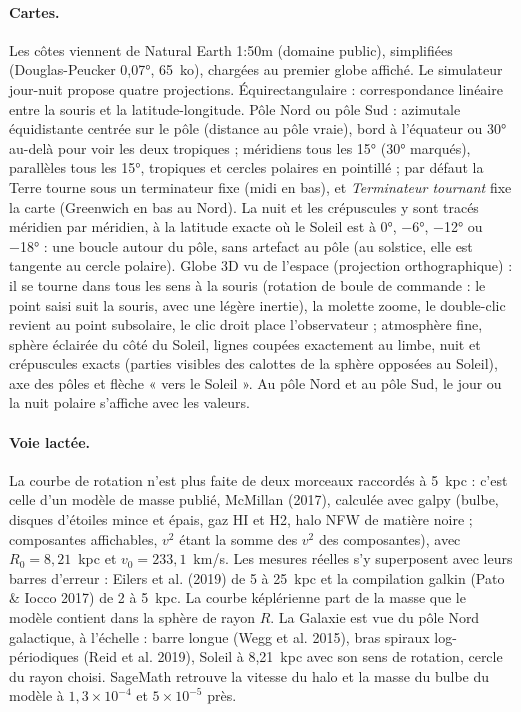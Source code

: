 \paragraph{Cartes.} Les côtes viennent de Natural Earth 1:50m (domaine public), simplifiées (Douglas-Peucker 0,07°,
65~ko), chargées au premier globe affiché. Le simulateur jour-nuit propose quatre projections. Équirectangulaire :
correspondance linéaire entre la souris et la latitude-longitude. Pôle Nord ou pôle Sud : azimutale équidistante
centrée sur le pôle (distance au pôle vraie), bord à l'équateur ou 30° au-delà pour voir les deux tropiques ;
méridiens tous les 15° (30° marqués), parallèles tous les 15°, tropiques et cercles polaires en pointillé ; par défaut
la Terre tourne sous un terminateur fixe (midi en bas), et \emph{Terminateur tournant} fixe la carte (Greenwich en
bas au Nord). La nuit et les crépuscules y sont tracés méridien par méridien, à la latitude exacte où le Soleil est à
0°, −6°, −12° ou −18° : une boucle autour du pôle, sans artefact au pôle (au solstice, elle est tangente au cercle
polaire). Globe 3D vu de l'espace (projection orthographique) : il se tourne dans tous les sens à la souris (rotation
de boule de commande : le point saisi suit la souris, avec une légère inertie), la molette zoome, le double-clic
revient au point subsolaire, le clic droit place l'observateur ; atmosphère fine, sphère éclairée du côté du Soleil,
lignes coupées exactement au limbe, nuit et crépuscules exacts (parties visibles des calottes de la sphère opposées
au Soleil), axe des pôles et flèche « vers le Soleil ». Au pôle Nord et au pôle Sud, le jour ou la nuit polaire
s'affiche avec les valeurs.

\paragraph{Voie lactée.} La courbe de rotation n'est plus faite de deux morceaux raccordés à 5~kpc : c'est celle d'un
modèle de masse publié, McMillan (2017), calculée avec galpy (bulbe, disques d'étoiles mince et épais, gaz HI et H2,
halo NFW de matière noire ; composantes affichables, $v^2$ étant la somme des $v^2$ des composantes), avec
$R_0 = 8{,}21$~kpc et $v_0 = 233{,}1$~km/s. Les mesures réelles s'y superposent avec leurs barres d'erreur : Eilers et
al. (2019) de 5 à 25~kpc et la compilation galkin (Pato \& Iocco 2017) de 2 à 5~kpc. La courbe képlérienne part de la
masse que le modèle contient dans la sphère de rayon $R$. La Galaxie est vue du pôle Nord galactique, à l'échelle :
barre longue (Wegg et al. 2015), bras spiraux log-périodiques (Reid et al. 2019), Soleil à 8,21~kpc avec son sens de
rotation, cercle du rayon choisi. SageMath retrouve la vitesse du halo et la masse du bulbe du modèle à
$1{,}3\times10^{-4}$ et $5\times10^{-5}$ près.

